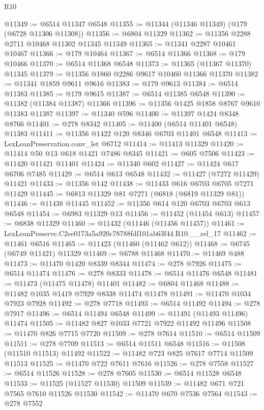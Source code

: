 \begin{lexlean}{R10}
\begin{coremodule}
@11349 := @6514 @11347 @6548
@11355 := @11344 (@11346 @11349) (@179 (@6728 @11306 @11308))
@11356 := @6804 @11329
@11362 := @11356 @2288 @2711 @10468 @11302 @11345 @11349
@11365 := @11341 @2287 @10461 @10467
@11366 := @179 @10464
@11367 := @6514 @11366
@11368 := @179 @10466
@11370 := @6514 @11368 @6548
@11373 := @11365 (@11367 @11370) @11345
@11379 := @11356 @1860 @2286 @9617 @10460 @11366 @11370
@11382 := @11341 @1859 @9611 @9616
@11383 := @179 @9613
@11384 := @6514 @11383
@11385 := @179 @9615
@11387 := @6514 @11385 @6548
@11390 := @11382 (@11384 @11387) @11366
@11396 := @11356 @1425 @1858 @8767 @9610 @11383 @11387
@11397 := @11340 @596
@11400 := @11397 @1424 @8348 @8766
@11401 := @278 @8342
@11405 := @11400 (@6514 @11401 @6548) @11383
@11411 := @11356 @1422 @120 @8346 @6703 @11401 @6548
@11413 := LexLeanPreservation.conv_let @6712
@11414 := @11413 @11329
@11420 := @11414 @50 @13 @618 @1421 @7486 @8345
@11421 := @605 @7506
@11423 := @11420 @11421 @11401
@11424 := @11340 @602
@11427 := @11424 @617 @6706 @7485
@11429 := @6514 @613 @6548
@11432 := @11427 (@7272 @11429) @11421
@11433 := @11356 @142
@11438 := @11433 @616 @6703 @6705 @7271 @11429
@11445 := @6813 @11329 @81 @7271 (@6818 (@6819 @11329 @81))
@11446 := @11438 @11445
@11452 := @11356 @614 @120 @6703 @6703 @613 @6548
@11454 := @6983 @11329 @13
@11456 := @11452 (@11454 @613)
@11457 := @6838 @11329
@11460 := @11432 (@11446 (@11456 @11457))
@11461 := LexLeanPreserve.C2ee0173a5a920c78788fdf101ab63f44.R10.__rel_17
@11462 := @11461 @6516
@11465 := @11423 (@11460 (@11462 @612))
@11468 := @6745 (@6749 @11421) @11329
@11469 := @6788 @11468
@11470 := @11469 @488
@11473 := @11470 @1420 @8339 @8344
@11474 := @278 @7926
@11475 := @6514 @11474
@11476 := @278 @8333
@11478 := @6514 @11476 @6548
@11481 := @11473 (@11475 @11478) @11401
@11482 := @6804 @11468
@11488 := @11482 @1035 @1419 @7929 @8338 @11474 @11478
@11491 := @11470 @1034 @7923 @7928
@11492 := @278 @7718
@11493 := @6514 @11492
@11494 := @278 @7917
@11496 := @6514 @11494 @6548
@11499 := @11491 (@11493 @11496) @11474
@11505 := @11482 @827 @1033 @7721 @7922 @11492 @11496
@11508 := @11470 @826 @7715 @7720
@11509 := @278 @7614
@11510 := @6514 @11509
@11511 := @278 @7709
@11513 := @6514 @11511 @6548
@11516 := @11508 (@11510 @11513) @11492
@11522 := @11482 @723 @825 @7617 @7714 @11509 @11513
@11525 := @11470 @722 @7611 @7616
@11526 := @278 @7558
@11527 := @6514 @11526
@11528 := @278 @7605
@11530 := @6514 @11528 @6548
@11533 := @11525 (@11527 @11530) @11509
@11539 := @11482 @671 @721 @7565 @7610 @11526 @11530
@11542 := @11470 @670 @7536 @7564
@11543 := @278 @7552

\end{coremodule}
\end{lexlean}

